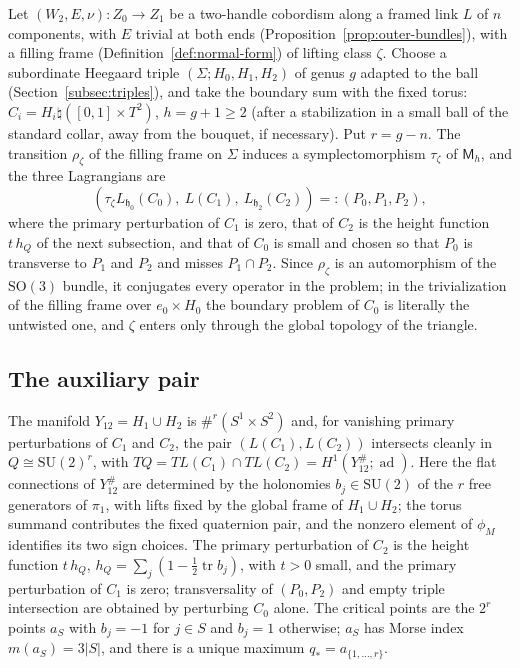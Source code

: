 \documentclass[11pt]{amsart}
\theoremstyle{definition}
\theoremstyle{remark}
\theoremstyle{plain}
\numberwithin{equation}{section}
\newcommand{\ad}{\operatorname{ad}}
\newcommand{\tr}{\operatorname{tr}}
\newcommand{\SO}{\mathrm{SO}}
\newcommand{\SU}{\mathrm{SU}}
\newcommand{\Msf}{\mathsf{M}}
\begin{document}
Let $(W_2,E,\nu)\colon Z_0\to Z_1$ be a two-handle cobordism along a framed
link $L$ of $n$ components, with $E$ trivial at both ends
(Proposition~\ref{prop:outer-bundles}), with a filling frame
(Definition~\ref{def:normal-form}) of lifting class $\zeta$. Choose a
subordinate Heegaard triple $(\Sigma;H_0,H_1,H_2)$ of genus $g$ adapted
to the ball (Section~\ref{subsec:triples}), and take the boundary sum with the fixed torus: $C_i=H_i\natural([0,1]\times T^2)$, $h=g+1\ge2$ (after a
stabilization in a small ball of the standard collar, away from the bouquet, if necessary). Put
$r=g-n$. The transition $\rho_\zeta$ of the filling frame on $\Sigma$ induces a
symplectomorphism $\tau_\zeta$ of $\Msf_h$, and the three Lagrangians are
\begin{equation}\label{eq:triple}
(\tau_\zeta L_{\mathfrak h_0}(C_0),\ L(C_1),\ L_{\mathfrak h_2}(C_2))=:(P_0,P_1,P_2),
\end{equation}
where the primary perturbation of $C_1$ is zero, that of $C_2$ is the height
function $t\,h_Q$ of the next subsection, and that of $C_0$ is small and chosen
so that $P_0$ is transverse to $P_1$ and $P_2$ and misses $P_1\cap P_2$.
Since $\rho_\zeta$ is an automorphism of the $\SO(3)$ bundle, it conjugates
every operator in the problem; in the trivialization of the filling frame over $e_0\times H_0$ the boundary problem of $C_0$ is literally the untwisted one, and $\zeta$ enters only
through the global topology of the triangle.

\subsection{The auxiliary pair}

The manifold $Y_{12}=H_1\cup H_2$ is $\#^r(S^1\times S^2)$ and, for vanishing
primary perturbations of $C_1$ and $C_2$, the pair $(L(C_1),L(C_2))$
intersects cleanly in $Q\cong\SU(2)^r$, with $TQ=TL(C_1)\cap TL(C_2)=
H^1(Y_{12}^\#;\ad)$. Here the flat connections of $Y_{12}^\#$ are determined
by the holonomies $b_j\in\SU(2)$ of the $r$ free generators of $\pi_1$, with
lifts fixed by the global frame of $H_1\cup H_2$; the torus summand
contributes the fixed quaternion pair, and the nonzero element of $\phi_M$ identifies its two sign choices. The primary perturbation of $C_2$ is the
height function $t\,h_Q$, $h_Q=\sum_j(1-\tfrac12\tr b_j)$, with $t>0$ small,
and the primary perturbation of $C_1$ is zero; transversality of
$(P_0,P_2)$ and empty triple intersection are obtained by perturbing $C_0$
alone. The critical points are the $2^r$ points $a_S$ with $b_j=-1$ for
$j\in S$ and $b_j=1$ otherwise; $a_S$ has Morse index $m(a_S)=3|S|$, and there
is a unique maximum $q_*=a_{\{1,\dots,r\}}$.
\end{document}

